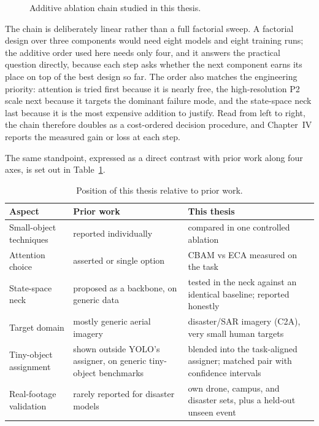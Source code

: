 \begin{figure}[tbp]
  \centering
  \caption{Additive ablation chain studied in this thesis.}
  \label{fig:chain}
\end{figure}

The chain is deliberately linear rather than a full factorial sweep. A
factorial design over three components would need eight models and eight
training runs; the additive order used here needs only four, and it answers the
practical question directly, because each step asks whether the next component
earns its place on top of the best design so far. The order also matches the
engineering priority: attention is tried first because it is nearly free, the
high-resolution P2 scale next because it targets the dominant failure mode, and
the state-space neck last because it is the most expensive addition to justify.
Read from left to right, the chain therefore doubles as a cost-ordered decision
procedure, and Chapter~IV reports the measured gain or loss at each step.

The same standpoint, expressed as a direct contrast with prior work along four
axes, is set out in Table~\ref{tab:gap}.

\begin{table}[tbp]
  \centering
  \caption{Position of this thesis relative to prior work.}
  \label{tab:gap}
  \small
  \setlength{\tabcolsep}{5pt}
  \renewcommand{\arraystretch}{1.15}
  \begin{tabular}{@{}
    >{\raggedright\arraybackslash}p{3.8cm}
    >{\raggedright\arraybackslash}p{4.7cm}
    >{\raggedright\arraybackslash}p{4.7cm}@{}}
    \toprule
    Aspect & Prior work & This thesis \\
    \midrule
    Small-object techniques & reported individually & compared in one controlled ablation \\
    Attention choice & asserted or single option & CBAM vs ECA measured on the task \\
    State-space neck & proposed as a backbone, on generic data & tested in the neck against an identical baseline; reported honestly \\
    Target domain & mostly generic aerial imagery & disaster/SAR imagery (C2A), very small human targets \\
    Tiny-object assignment & shown outside YOLO's assigner, on generic tiny-object benchmarks & blended into the task-aligned assigner; matched pair with confidence intervals \\
    Real-footage validation & rarely reported for disaster models & own drone, campus, and disaster sets, plus a held-out unseen event \\
    \bottomrule
  \end{tabular}
\end{table}

